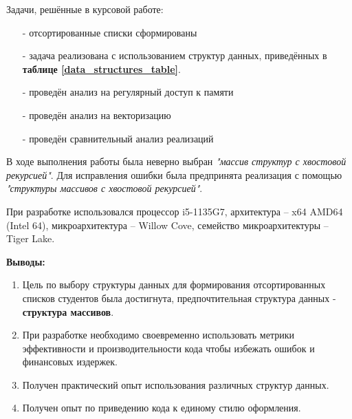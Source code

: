 \documentclass[a4paper, 12pt] {article}
\begin{document}
  Задачи, решённые в курсовой работе:
\begin{itemize}
  \item[-] отсортированные списки сформированы
  \item[-] задача реализована с использованием структур данных,
    приведённых в \textbf{таблице \ref{data_structures_table}}.
  \item[-] проведён анализ на регулярный доступ к памяти
  \item[-] проведён анализ на векторизацию
  \item[-] проведён сравнительный анализ реализаций
\end{itemize}

  В ходе выполнения работы была неверно выбран \textit{"массив структур с хвостовой
рекурсией"}. Для исправления ошибки была предпринята реализация с
помощью \textit{"структуры массивов с хвостовой рекурсией"}.

  При разработке использовался процессор i5-1135G7, архитектура – x64
AMD64 (Intel 64), микроархитектура – Willow Cove, семейство
микроархитектуры – Tiger Lake.\\ \medskip

\textbf{Выводы:} 
\begin{enumerate}
  \item Цель по выбору структуры данных для формирования отсортированных
    списков студентов была достигнута, предпочтительная структура
    данных - \textbf{структура массивов}.
  \item При разработке необходимо своевременно использовать метрики эффективности и
    производительности кода чтобы избежать ошибок и финансовых издержек.
  \item Получен практический опыт использования различных структур
    данных.
  \item Получен опыт по приведению кода к единому стилю оформления. 
\end{enumerate}

\end{document}
